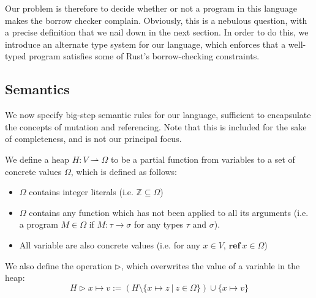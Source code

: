 \documentclass{article}
\newcommand{\mkref}{\textbf{ref}~}
\newcommand{\parfun}{\rightharpoonup}
\newcommand{\overwrite}{\triangleright}
\begin{document}
Our problem is therefore to decide whether or not a program in this language makes the borrow checker complain. Obviously, this is a nebulous question, with a precise definition that we nail down in the next section. In order to do this, we introduce an alternate type system for our language, which enforces that a well-typed program satisfies some of Rust's borrow-checking constraints.


\subsection{Semantics}

We now specify big-step semantic rules for our language, sufficient to encapsulate the concepts of mutation and referencing. Note that this is included for the sake of completeness, and is not our principal focus.

We define a heap $H : V \parfun \Omega$ to be a partial function from variables to a set of concrete values $\Omega$, which is defined as follows: 
\begin{itemize}
    \item $\Omega$ contains integer literals (i.e. $\mathbb{Z} \subseteq \Omega$)
    \item $\Omega$ contains any function which has not been applied to all its arguments (i.e. a program $M \in \Omega$ if $M : \tau \rightarrow \sigma$ for any types $\tau$ and $\sigma$).
    \item All variable are also concrete values (i.e. for any  $x \in V$, $\mkref x \in \Omega$) %
\end{itemize}
We also define the operation $\overwrite$, which overwrites the value of a variable in the heap: 
\begin{equation*}
    H \overwrite x \mapsto v := (H \setminus \{x \mapsto z ~|~ z \in \Omega \} ) \cup \{x \mapsto v\} 
\end{equation*}
\end{document}
